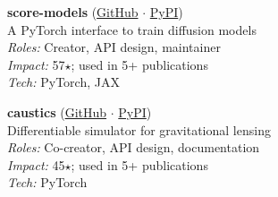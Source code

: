 \begin{minipage}[t]{0.48\textwidth}
  \noindent\textbf{score-models} (\href{https://github.com/AlexandreAdam/score_models}{GitHub} $\cdot$ \href{https://pypi.org/project/score-models/}{PyPI})\\[-0.15em]
  \small A PyTorch interface to train diffusion models\\
  \emph{Roles:} Creator, API design, maintainer \\
  \emph{Impact:} 57$\star$; used in 5+ publications \\
  \emph{Tech:} PyTorch, JAX\par\vspace{0.6em}
\end{minipage}\hfill
\begin{minipage}[t]{0.48\textwidth}
  \noindent\textbf{caustics} (\href{https://github.com/Ciela-Institute/caustics}{GitHub} $\cdot$ \href{https://pypi.org/project/caustics/}{PyPI})\\[-0.15em]
  \small Differentiable simulator for gravitational lensing\\
  \emph{Roles:} Co-creator, API design, documentation \\
  \emph{Impact:} 45$\star$; used in 5+ publications \\
  \emph{Tech:} PyTorch \par
\end{minipage}
